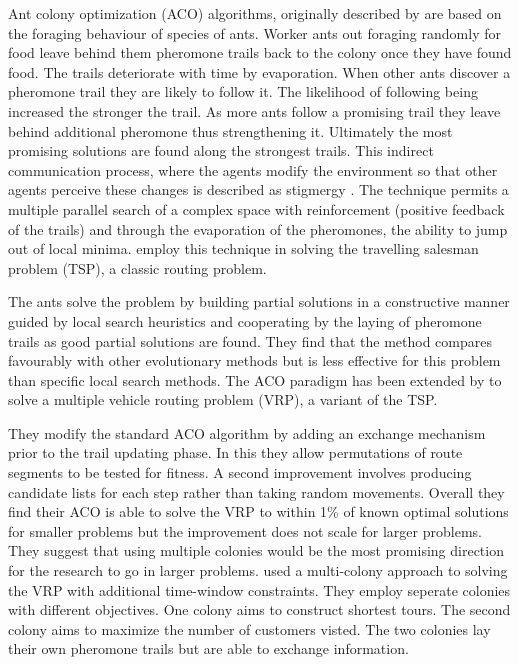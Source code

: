 Ant colony optimization (ACO) algorithms, originally described by \citet{dorigo92optimization} are based on the foraging behaviour of species of ants. Worker ants out foraging randomly for food leave behind them pheromone trails back to the colony once they have found food. The trails deteriorate with time by evaporation. When other ants discover a pheromone trail they are likely to follow it. The likelihood of following being increased the stronger the trail. As more ants follow a promising trail they leave behind additional pheromone thus strengthening it. Ultimately the most promising solutions are found along the strongest trails. This indirect communication process, where the agents modify the environment so that other agents perceive these changes is described as stigmergy \citep{grasse59ants}. The technique permits a multiple parallel search of a complex space with reinforcement (positive feedback of the trails) and through the evaporation of the pheromones, the ability to jump out of local minima. \citet{dorigo95ant} employ this technique in solving the travelling salesman problem (TSP), a classic routing problem. 

The ants solve the problem by building partial solutions in a constructive manner guided by local search heuristics and cooperating by the laying of pheromone trails as good partial solutions are found. They find that the method compares favourably with other evolutionary methods but is less effective for this problem than specific local search methods. The ACO paradigm has been extended by \citet{bell04ant} to solve a multiple vehicle routing problem (VRP), a variant of the TSP. 

They modify the standard ACO algorithm by adding an exchange mechanism prior to the trail updating phase. In this they allow permutations of route segments to be tested for fitness. A second improvement involves producing candidate lists for each step rather than taking random movements. Overall they find their ACO is able to solve the VRP to within 1\% of known optimal solutions for smaller problems but the improvement does not scale for larger problems. They suggest that using multiple colonies would be the most promising direction for the research to go in larger problems. \citet{gambardella99multiple} used a multi-colony approach to solving the VRP with additional time-window constraints. They employ seperate colonies with different objectives. One colony aims to construct shortest tours. The second colony aims to maximize the number of customers visted. The two colonies lay their own pheromone trails but are able to exchange information.


